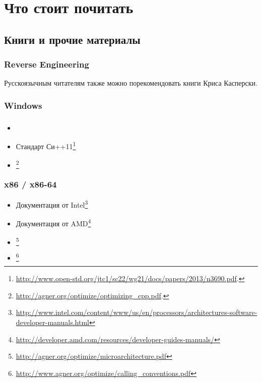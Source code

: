 \part{Что стоит почитать}

\chapter{Книги и прочие материалы}

\section{Reverse Engineering}



Русскоязычным читателям также можно порекомендовать книги Криса Касперски.

\section{Windows}



\section{\CCpp}

\section{\CCpp}

\begin{itemize}
\item \KRBook

\item Стандарт Си++11\footnote{\AlsoAvailableAs \url{http://www.open-std.org/jtc1/sc22/wg21/docs/papers/2013/n3690.pdf}.}

\item [\AgnerFogCPP]\footnote{\AlsoAvailableAs \url{http://agner.org/optimize/optimizing_cpp.pdf}.}
\end{itemize}

\section{x86 / x86-64}

\label{x86_manuals}
\begin{itemize}
\item Документация от Intel\footnote{\AlsoAvailableAs \url{http://www.intel.com/content/www/us/en/processors/architectures-software-developer-manuals.html}}

\item Документация от AMD\footnote{\AlsoAvailableAs \url{http://developer.amd.com/resources/developer-guides-manuals/}}

\item \AgnerFog{}\footnote{\AlsoAvailableAs \url{http://agner.org/optimize/microarchitecture.pdf}}

\item \AgnerFogCC{}\footnote{\AlsoAvailableAs \url{http://www.agner.org/optimize/calling_conventions.pdf}}
\end{itemize}

